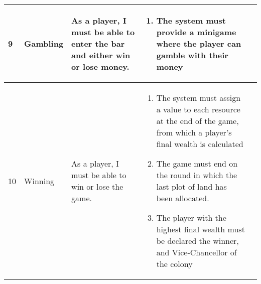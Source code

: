 \begin{landscape}
\begin{longtable}{|l||l|p{4cm}|p{8cm}|p{7cm}|}
	9 & Gambling
	& As a player, I must be able to enter the bar and either win or lose money.
	& \begin{enumerate}[label=9.1.\arabic*.]
		\item The system must provide a minigame where the player can gamble with their money
	\end{enumerate} & \\ \hline

	10 & Winning
	& As a player, I must be able to win or lose the game.
	& \begin{enumerate}[label=10.1.\arabic*.]
		\item The system must assign a value to each resource at the end of the game, from which a player's final wealth is calculated
		\item The game must end on the round in which the last plot of land has been allocated.
		\item The player with the highest final wealth must be declared the winner, and Vice-Chancellor of the colony
	\end{enumerate} & \\ \hline
	\end{longtable}
\end{landscape}